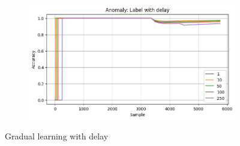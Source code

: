 \begin{figure}[ht]
\begin{subfigure}[b]{0.49\textwidth}
        \caption{}
    \end{subfigure}
    \hfill
    \begin{subfigure}[b]{0.49\textwidth}
        \includegraphics[width=\textwidth]{assets/design/gradual-learning-delay-spectral-domain-anomaly60.png}
        \caption{}
    \end{subfigure}
    \caption{Gradual learning with delay}
\end{figure}



